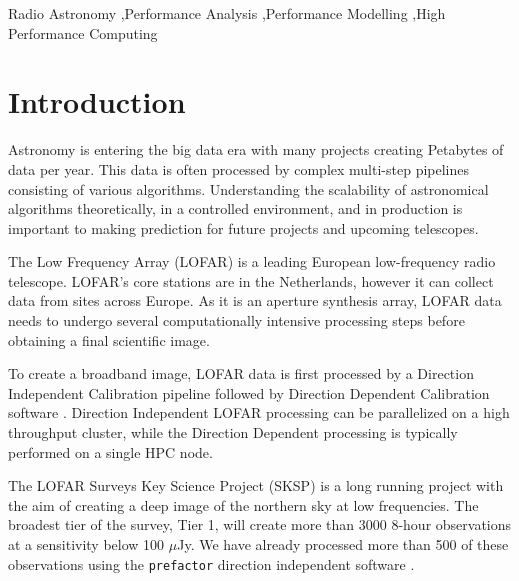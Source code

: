 \documentclass[preprint,5p]{elsarticle}
\begin{document}
\begin{frontmatter}
\begin{abstract}
\end{abstract}
\begin{keyword}
Radio Astronomy \sep Performance Analysis \sep Performance Modelling \sep High Performance Computing


\end{keyword}
\end{frontmatter}

%

\section{\label{sec:intro}Introduction }

Astronomy is entering the big data era with many projects creating Petabytes of data per year. This data is often processed by complex multi-step pipelines consisting of various algorithms. Understanding the scalability of astronomical algorithms theoretically, in a controlled environment, and in production is important to making prediction for future projects and upcoming telescopes. 

The Low Frequency Array (LOFAR) \citep{LOFAR} is a leading European low-frequency radio telescope. LOFAR's core stations are in the Netherlands, however it can collect data from sites across Europe. As it is an aperture synthesis array, LOFAR data needs to undergo several computationally intensive processing steps before obtaining a final scientific image. 

To create a broadband image, LOFAR data is first processed by a Direction Independent Calibration pipeline followed by Direction Dependent Calibration software \citep{lofar_prefactor, Wendy_bootes,tassesmirnov, tasse2018faceting}. Direction Independent LOFAR processing can be parallelized on a high throughput cluster, while the Direction Dependent processing is typically performed on a single HPC node. 

The LOFAR Surveys Key Science Project (SKSP) \citep{lotss, LOTSS_DR2} is a long running project with the aim of creating a deep image of the northern sky at low frequencies. The broadest tier of the survey, Tier 1, will create more than 3000 8-hour observations at a sensitivity below 100 $\mu$Jy. We have already processed more than 500 of these observations using the \texttt{prefactor} direction independent software \citep{prefactor_zenodo}. 
\end{document}
